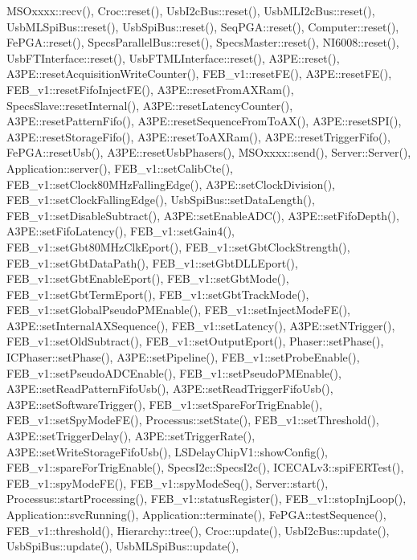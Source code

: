M\+S\+Oxxxx\+::recv(), Croc\+::reset(), Usb\+I2c\+Bus\+::reset(), Usb\+M\+L\+I2c\+Bus\+::reset(), Usb\+M\+L\+Spi\+Bus\+::reset(), Usb\+Spi\+Bus\+::reset(), Seq\+P\+G\+A\+::reset(), Computer\+::reset(), Fe\+P\+G\+A\+::reset(), Specs\+Parallel\+Bus\+::reset(), Specs\+Master\+::reset(), N\+I6008\+::reset(), Usb\+F\+T\+Interface\+::reset(), Usb\+F\+T\+M\+L\+Interface\+::reset(), A3\+P\+E\+::reset(), A3\+P\+E\+::reset\+Acquisition\+Write\+Counter(), F\+E\+B\+\_\+v1\+::reset\+F\+E(), A3\+P\+E\+::reset\+F\+E(), F\+E\+B\+\_\+v1\+::reset\+Fifo\+Inject\+F\+E(), A3\+P\+E\+::reset\+From\+A\+X\+Ram(), Specs\+Slave\+::reset\+Internal(), A3\+P\+E\+::reset\+Latency\+Counter(), A3\+P\+E\+::reset\+Pattern\+Fifo(), A3\+P\+E\+::reset\+Sequence\+From\+To\+A\+X(), A3\+P\+E\+::reset\+S\+P\+I(), A3\+P\+E\+::reset\+Storage\+Fifo(), A3\+P\+E\+::reset\+To\+A\+X\+Ram(), A3\+P\+E\+::reset\+Trigger\+Fifo(), Fe\+P\+G\+A\+::reset\+Usb(), A3\+P\+E\+::reset\+Usb\+Phasers(), M\+S\+Oxxxx\+::send(), Server\+::\+Server(), Application\+::server(), F\+E\+B\+\_\+v1\+::set\+Calib\+Cte(), F\+E\+B\+\_\+v1\+::set\+Clock80\+M\+Hz\+Falling\+Edge(), A3\+P\+E\+::set\+Clock\+Division(), F\+E\+B\+\_\+v1\+::set\+Clock\+Falling\+Edge(), Usb\+Spi\+Bus\+::set\+Data\+Length(), F\+E\+B\+\_\+v1\+::set\+Disable\+Subtract(), A3\+P\+E\+::set\+Enable\+A\+D\+C(), A3\+P\+E\+::set\+Fifo\+Depth(), A3\+P\+E\+::set\+Fifo\+Latency(), F\+E\+B\+\_\+v1\+::set\+Gain4(), F\+E\+B\+\_\+v1\+::set\+Gbt80\+M\+Hz\+Clk\+Eport(), F\+E\+B\+\_\+v1\+::set\+Gbt\+Clock\+Strength(), F\+E\+B\+\_\+v1\+::set\+Gbt\+Data\+Path(), F\+E\+B\+\_\+v1\+::set\+Gbt\+D\+L\+L\+Eport(), F\+E\+B\+\_\+v1\+::set\+Gbt\+Enable\+Eport(), F\+E\+B\+\_\+v1\+::set\+Gbt\+Mode(), F\+E\+B\+\_\+v1\+::set\+Gbt\+Term\+Eport(), F\+E\+B\+\_\+v1\+::set\+Gbt\+Track\+Mode(), F\+E\+B\+\_\+v1\+::set\+Global\+Pseudo\+P\+M\+Enable(), F\+E\+B\+\_\+v1\+::set\+Inject\+Mode\+F\+E(), A3\+P\+E\+::set\+Internal\+A\+X\+Sequence(), F\+E\+B\+\_\+v1\+::set\+Latency(), A3\+P\+E\+::set\+N\+Trigger(), F\+E\+B\+\_\+v1\+::set\+Old\+Subtract(), F\+E\+B\+\_\+v1\+::set\+Output\+Eport(), Phaser\+::set\+Phase(), I\+C\+Phaser\+::set\+Phase(), A3\+P\+E\+::set\+Pipeline(), F\+E\+B\+\_\+v1\+::set\+Probe\+Enable(), F\+E\+B\+\_\+v1\+::set\+Pseudo\+A\+D\+C\+Enable(), F\+E\+B\+\_\+v1\+::set\+Pseudo\+P\+M\+Enable(), A3\+P\+E\+::set\+Read\+Pattern\+Fifo\+Usb(), A3\+P\+E\+::set\+Read\+Trigger\+Fifo\+Usb(), A3\+P\+E\+::set\+Software\+Trigger(), F\+E\+B\+\_\+v1\+::set\+Spare\+For\+Trig\+Enable(), F\+E\+B\+\_\+v1\+::set\+Spy\+Mode\+F\+E(), Processus\+::set\+State(), F\+E\+B\+\_\+v1\+::set\+Threshold(), A3\+P\+E\+::set\+Trigger\+Delay(), A3\+P\+E\+::set\+Trigger\+Rate(), A3\+P\+E\+::set\+Write\+Storage\+Fifo\+Usb(), L\+S\+Delay\+Chip\+V1\+::show\+Config(), F\+E\+B\+\_\+v1\+::spare\+For\+Trig\+Enable(), Specs\+I2c\+::\+Specs\+I2c(), I\+C\+E\+C\+A\+Lv3\+::spi\+F\+E\+R\+Test(), F\+E\+B\+\_\+v1\+::spy\+Mode\+F\+E(), F\+E\+B\+\_\+v1\+::spy\+Mode\+Seq(), Server\+::start(), Processus\+::start\+Processing(), F\+E\+B\+\_\+v1\+::status\+Register(), F\+E\+B\+\_\+v1\+::stop\+Inj\+Loop(), Application\+::svc\+Running(), Application\+::terminate(), Fe\+P\+G\+A\+::test\+Sequence(), F\+E\+B\+\_\+v1\+::threshold(), Hierarchy\+::tree(), Croc\+::update(), Usb\+I2c\+Bus\+::update(), Usb\+Spi\+Bus\+::update(), Usb\+M\+L\+Spi\+Bus\+::update(), 